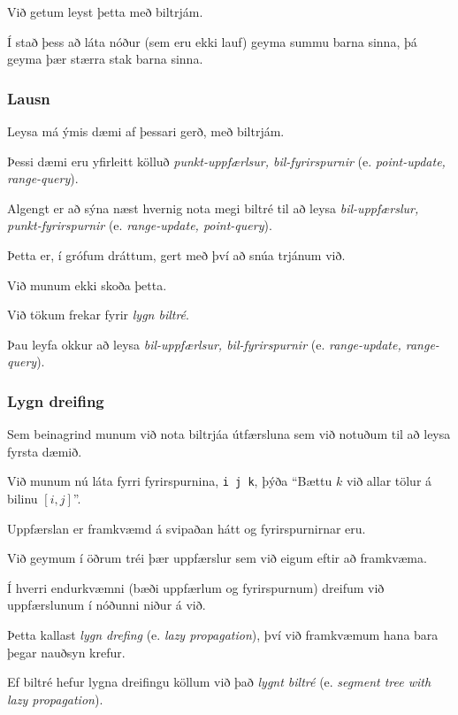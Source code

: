 {
	{
		\item<1-> Við getum leyst þetta með biltrjám.
		\item<2-> Í stað þess að láta nóður (sem eru ekki lauf) geyma summu barna sinna, þá geyma þær stærra stak barna sinna.
	}
}

{
	\frametitle{Lausn}
}

{
	{
		\item<1-> Leysa má ýmis dæmi af þessari gerð, með biltrjám.
		\item<2-> Þessi dæmi eru yfirleitt kölluð \emph{punkt-uppfærlsur, bil-fyrirspurnir} (e. \emph{point-update, range-query}).
		\item<3-> Algengt er að sýna næst hvernig nota megi biltré til að leysa \emph{bil-uppfærslur, punkt-fyrirspurnir}
					(e. \emph{range-update, point-query}).
		\item<4-> Þetta er, í grófum dráttum, gert með því að snúa trjánum við.
		\item<5-> Við munum ekki skoða þetta.
		\item<6-> Við tökum frekar fyrir \emph{lygn biltré}.
		\item<7-> Þau leyfa okkur að leysa \emph{bil-uppfærlsur, bil-fyrirspurnir} (e. \emph{range-update, range-query}).
	}
}

{
	\frametitle{Lygn dreifing}
	{
		\item<1-> Sem beinagrind munum við nota biltrjáa útfærsluna sem við notuðum til að leysa fyrsta dæmið.
		\item<2-> Við munum nú láta fyrri fyrirspurnina, \texttt{i j k}, þýða ``Bættu $k$ við allar tölur á bilinu $[i, j]$''.
		\item<3-> Uppfærslan er framkvæmd á svipaðan hátt og fyrirspurnirnar eru.
		\item<4-> Við geymum í öðrum tréi þær uppfærslur sem við eigum eftir að framkvæma.
		\item<5-> Í hverri endurkvæmni (bæði uppfærlum og fyrirspurnum) dreifum við uppfærslunum í nóðunni niður á við.
		\item<6-> Þetta kallast \emph{lygn drefing} (e. \emph{lazy propagation}), því við framkvæmum hana bara þegar nauðsyn krefur.
		\item<7-> Ef biltré hefur lygna dreifingu köllum við það \emph{lygnt biltré} (e. \emph{segment tree with lazy propagation}).
	}
}

